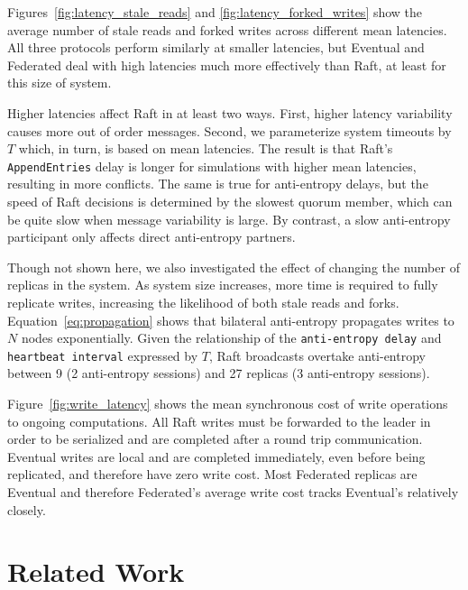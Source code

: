 \documentclass[10pt,conference,letterpaper]{IEEEtran}
\begin{document}
Figures~\ref{fig:latency_stale_reads} and \ref{fig:latency_forked_writes} show
the average number of stale reads and forked writes across different mean
latencies.
All three protocols perform similarly at smaller latencies, but Eventual and
Federated deal with high latencies much more effectively than Raft, at least
for this size of system.

Higher latencies affect Raft in at least two ways.
First, higher latency variability causes more out of order messages.
Second, we parameterize system timeouts by $T$ which, in turn, is based on
mean latencies.
The result is that Raft's \texttt{AppendEntries} delay is longer for
simulations with higher mean latencies, resulting in more conflicts.
The same is true for anti-entropy delays, but the speed of Raft decisions is
determined by the slowest quorum member, which can be quite slow when message
variability is large.
By contrast, a slow anti-entropy participant only affects direct anti-entropy
partners.

Though not shown here, we also investigated the effect of changing the number
of replicas in the system. 
As system size increases, more time is required to fully replicate writes,
increasing the likelihood of both stale reads and forks.
Equation~\ref{eq:propagation} shows that bilateral anti-entropy propagates writes
to $N$ nodes exponentially.
Given the relationship of the \texttt{anti-entropy delay} and \texttt{heartbeat interval}
expressed by $T$, Raft broadcasts overtake anti-entropy between 9 (2 anti-entropy
sessions) and 27 replicas (3 anti-entropy sessions).


Figure~\ref{fig:write_latency} shows the mean synchronous cost of write operations to
ongoing computations.
All Raft writes must be forwarded to the leader in order to be serialized and are
completed after a round trip communication.
Eventual writes are local and are completed immediately, even before being replicated,
and therefore have zero write cost.
Most Federated replicas are Eventual and therefore Federated's average write cost tracks
Eventual's relatively closely.

\section{Related Work}
\end{document}
